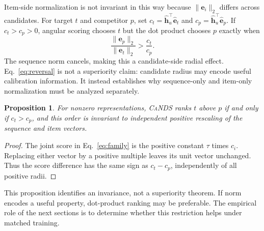 \documentclass[sigconf,anonymous,review]{acmart}
\newcommand{\cands}{\textsc{CaNDS}}
\newtheorem{proposition}{Proposition}
\begin{document}
Item-side normalization is not invariant in this way because $\|\bm e_i\|_2$ differs across candidates. For target $t$ and competitor $p$, set $c_t=\widehat{\bm h}_u^\top\widehat{\bm e}_t$ and $c_p=\widehat{\bm h}_u^\top\widehat{\bm e}_p$. If $c_t>c_p>0$, angular scoring chooses $t$ but the dot product chooses $p$ exactly when
\begin{equation}
\frac{\|\bm e_p\|_2}{\|\bm e_t\|_2}>\frac{c_t}{c_p}.\label{eq:reversal}
\end{equation}
The sequence norm cancels, making this a candidate-side radial effect. Eq.~\ref{eq:reversal} is not a superiority claim: candidate radius may encode useful calibration information. It instead establishes why sequence-only and item-only normalization must be analyzed separately.
\begin{proposition}For nonzero representations, \cands{} ranks $t$ above $p$ if and only if $c_t>c_p$, and this order is invariant to independent positive rescaling of the sequence and item vectors.\end{proposition}
\begin{proof}The joint score in Eq.~\ref{eq:family} is the positive constant $\tau$ times $c_i$. Replacing either vector by a positive multiple leaves its unit vector unchanged. Thus the score difference has the same sign as $c_t-c_p$, independently of all positive radii.\end{proof}
This proposition identifies an invariance, not a superiority theorem. If norm encodes a useful property, dot-product ranking may be preferable. The empirical role of the next sections is to determine whether this restriction helps under matched training.
\end{document}
